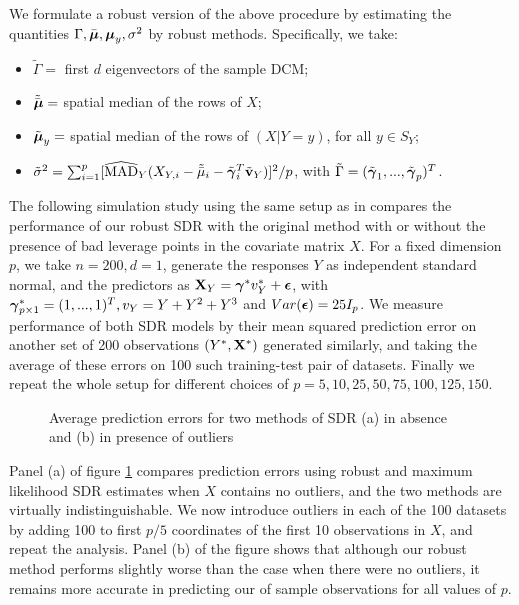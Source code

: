 \documentclass[fleqn,11pt]{article}
\begin{document}
We formulate a robust version of the above procedure by estimating the quantities $\Gamma, \bar{{\boldsymbol{\mu}}}, {\boldsymbol{\mu}}_y, \sigma^2$ by robust methods. Specifically, we take:
%
\begin{itemize}
\item $\tilde \Gamma = $ first $d$ eigenvectors of the sample DCM;
%
\item $\tilde{\bar{{\boldsymbol{\mu}}}} = $ spatial median of the rows of $X$;
%
\item $\tilde {{\boldsymbol{\mu}}}_y = $ spatial median of the rows of $(X|Y=y)$, for all $y \in S_Y$;
%
\item $\tilde\sigma^2 = \sum_{i=1}^p [\widehat{\text{MAD}}_Y (X_{Y,i} - \tilde{\bar\mu}_i - \tilde{{\boldsymbol{\gamma}}}_i^T \tilde{{\bf{v}}}_Y)]^2/p$, with $\tilde\Gamma = (\tilde{{\boldsymbol{\gamma}}}_1, ..., \tilde{{\boldsymbol{\gamma}}}_p)^T$.
\end{itemize}
%
The following simulation study using the same setup as in \citep{AdragniCook09} compares the performance of our robust SDR with the original method with or without the presence of bad leverage points in the covariate matrix $X$. For a fixed dimension $p$, we take $n=200, d=1$, generate the responses $Y$ as independent standard normal, and the predictors as ${\mathbf{X}}_Y = {\boldsymbol{\gamma}}^* v_Y^* + {\boldsymbol{\epsilon}}$, with ${\boldsymbol{\gamma}}^*_{p\times 1} = (1,...,1)^T, v_Y = Y + Y^2 + Y^3$ and $Var({\boldsymbol{\epsilon}}) = 25 I_p$. We measure performance of both SDR models by their mean squared prediction error on another set of 200 observations $(Y^*, {\mathbf{X}}^*)$ generated similarly, and taking the average of these errors on 100 such training-test pair of datasets. Finally we repeat the whole setup for different choices of $p = 5,10,25,50,75,100,125,150$.

\begin{figure}[t]
\begin{center}
\caption{Average prediction errors for two methods of SDR (a) in absence and (b) in presence of outliers}
\label{fig:SDRfig}
\end{center}
\end{figure}

Panel (a) of figure \ref{fig:SDRfig} compares prediction errors using robust and maximum likelihood SDR estimates when $X$ contains no outliers, and the two methods are virtually indistinguishable. We now introduce outliers in each of the 100 datasets by adding 100 to first $p/5$ coordinates of the first 10 observations in $X$, and repeat the analysis. Panel (b) of the figure shows that although our robust method performs slightly worse than the case when there were no outliers, it remains more accurate in predicting our of sample observations for all values of $p$. 
\end{document}
